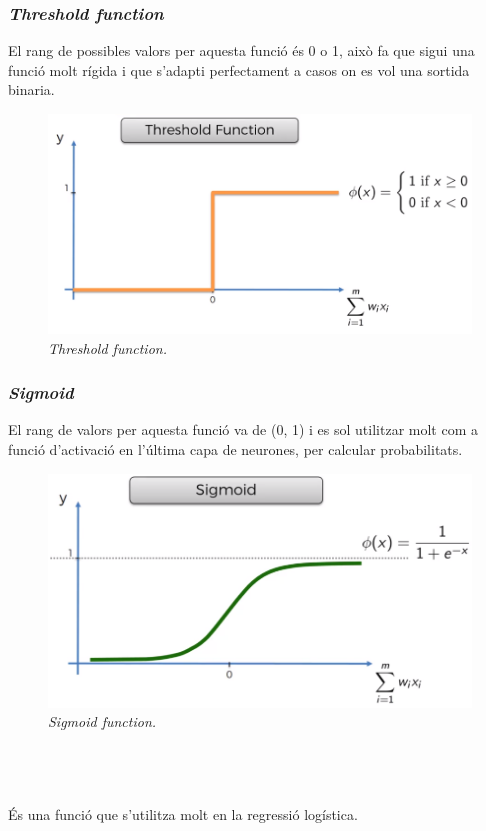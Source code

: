 \documentclass[12pt]{article}
\begin{document}
\subsubsection{\textit{Threshold function}}
El rang de possibles valors per aquesta funció és 0 o 1, això fa que sigui una funció molt rígida i que s'adapti perfectament a casos on es vol una sortida binaria.
\begin{figure}[h!]
	\centering
	\includegraphics[scale=0.3]{imatges/fa/1threshold.png}
	\caption{\textit{Threshold function.}}
\end{figure}

\subsubsection{\textit{Sigmoid}}
El rang de valors per aquesta funció va de (0, 1) i es sol utilitzar molt com a funció d'activació en l'última capa de neurones, per calcular probabilitats.
\begin{figure}[h!]
	\centering
	\includegraphics[scale=0.3]{imatges/fa/2sigmoid.png}
	\caption{\textit{Sigmoid function.}}
\end{figure}
\pagebreak
\\\\\\És una funció que s'utilitza molt en la regressió logística.
\end{document}
